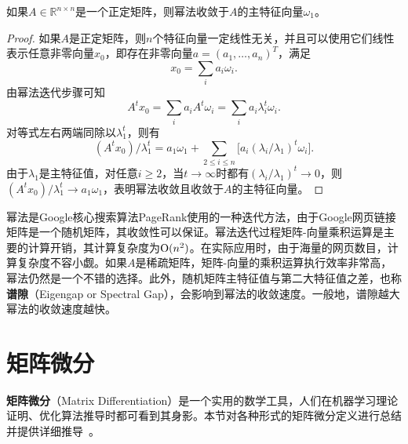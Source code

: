 \begin{theorem}
如果$A\in \mathbb R^{n\times n}$是一个正定矩阵，则幂法收敛于$A$的主特征向量$\omega_1$。

\begin{proof}
如果$A$是正定矩阵，则$n$个特征向量一定线性无关，并且可以使用它们线性表示任意非零向量$x_0$，即存在非零向量$a=(a_1,\ldots,a_n)^T$，满足
\[
    x_0 = \sum\limits_i a_i \omega_i.
\]
由幂法迭代步骤可知
\[
    A^t x_0 = \sum\limits_i a_i A^t \omega_i = \sum\limits_i a_i \lambda_i^t \omega_i.
\]
对等式左右两端同除以$\lambda_1^t$，则有
\begin{equation}
    (A^t x_0)/\lambda_1^t = a_1 \omega_1 + \sum\limits_{2\le i\le n} \big[a_i (\lambda_i/\lambda_1)^t \omega_i\big].
\end{equation}
由于$\lambda_1$是主特征值，对任意$i\ge 2$，当$t\to \infty$时都有$(\lambda_i/\lambda_1)^t \to 0$，则$(A^t x_0)/\lambda_1^t\to a_1 \omega_1$，表明幂法收敛且收敛于$A$的主特征向量。
\end{proof}
\end{theorem}

\begin{remark}
幂法是Google核心搜索算法PageRank使用的一种迭代方法，由于Google网页链接矩阵是一个随机矩阵，其收敛性可以保证。幂法迭代过程矩阵-向量乘积运算是主要的计算开销，其计算复杂度为$\operatorname{\mathrm{O}}(n^2)$。在实际应用时，由于海量的网页数目，计算复杂度不容小觑。如果$A$是稀疏矩阵，矩阵-向量的乘积运算执行效率非常高，幂法仍然是一个不错的选择。此外，随机矩阵主特征值与第二大特征值之差，也称\textbf{谱隙}（Eigengap or Spectral Gap），会影响到幂法的收敛速度。一般地，谱隙越大幂法的收敛速度越快。
\end{remark}

\section{矩阵微分}
\textbf{矩阵微分}（Matrix Differentiation）是一个实用的数学工具，人们在机器学习理论证明、优化算法推导时都可看到其身影。本节对各种形式的矩阵微分定义进行总结并提供详细推导~\cite{dhrymes1978mathematics}。

